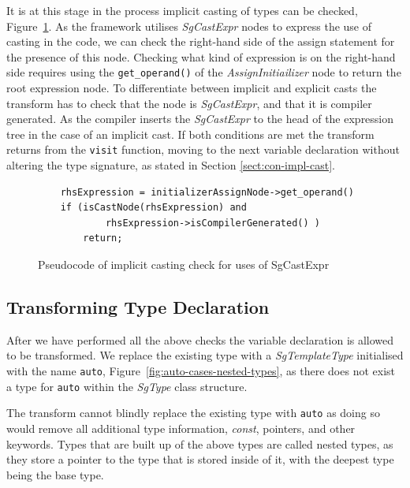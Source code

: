 \documentclass[bsc,frontabs,singlespacing,twoside,parskip,deptreport]{infthesis}
\begin{document}
It is at this stage in the process implicit casting of types can be checked, Figure~\ref{fig:cast-check-code}. As the framework utilises \textit{SgCastExpr} nodes to express the use of casting in the code, we can check the right-hand side of the assign statement for the presence of this node. Checking what kind of expression is on the right-hand side requires using the \texttt{get\_operand()} of the \textit{AssignInitiailizer} node to return the root expression node. To differentiate between implicit and explicit casts the transform has to check that the node is \textit{SgCastExpr}, and that it is compiler generated. As the compiler inserts the \textit{SgCastExpr} to the head of the expression tree in the case of an implicit cast. If both conditions are met the transform returns from the \texttt{visit} function, moving to the next variable declaration without altering the type signature, as stated in Section \ref{sect:con-impl-cast}. 

\begin{figure}[!h]
    \centering
    \begin{verbatim}
    rhsExpression = initializerAssignNode->get_operand()
    if (isCastNode(rhsExpression) and 
            rhsExpression->isCompilerGenerated() )
        return;
    \end{verbatim}
    \caption{Pseudocode of implicit casting check for uses of SgCastExpr}
    \label{fig:cast-check-code}
\end{figure}


\subsection{Transforming Type Declaration}
After we have performed all the above checks the variable declaration is allowed to be transformed. We replace the existing type with a \textit{SgTemplateType} initialised with the name \texttt{auto}, Figure~\ref{fig:auto-cases-nested-types}, as there does not exist a type for \texttt{auto} within the \textit{SgType} class structure. 

The transform cannot blindly replace the existing type with \texttt{auto} as doing so would remove all additional type information, \textit{const}, pointers, and other keywords. Types that are built up of the above types are called nested types, as they store a pointer to the type that is stored inside of it, with the deepest type being the base type.
\end{document}
